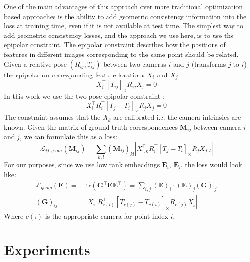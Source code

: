\documentclass[10pt,twocolumn,letterpaper]{article}
\newcommand{\mat}[1]{\mathbf{#1}}
\newcommand{\cross}[1]{[#1]_{\times}}
\begin{document}
One of the main advantages of this approach over more traditional optimization based approaches is the ability to add geometric consistency information into the loss at training time, even if it is not available at test time.
The simplest way to add geometric consistency losses, and the approach we use here, is to use the epipolar constraint.
The epipolar constraint describes how the positions of features in different images corresponding to the same point should be related.
Given a relative pose $(R_{ij}, T_{ij})$ between two cameras $i$ and $j$  (transforms $j$ to $i$) the epipolar on corresponding feature locations $X_i$ and $X_j$:
\begin{equation}
X_{i}^\top \cross{T_{ij}}R_{ij} X_{j} = 0
\label{eq:essential_constraint_rel}
\end{equation}
In this work we use the two pose epipolar constraint \cite{tron2014quotient}:
\begin{equation}
X_{i}^\top R_{i}^\top \cross{T_{j} - T_{i}}R_{j} X_{j} = 0
\label{eq:essential_constraint}
\end{equation}
The constraint assumes that the $X_k$ are calibrated i.e. the camera intrinsics are known. 
Given the matrix of ground truth correspondences $\mat{M}_{ij}$ between camera $i$ and $j$, we can formulate this as a loss:
\begin{equation}
\mathcal{L}_{ij,geom}(\mat{M}_{ij}) = \sum_{k,l} (\mat{M}_{ij})_{kl} \left|X_{i,k}^\top R_{i}^\top \cross{T_{j} - T_{i}}R_{j} X_{j,l}\right|
\label{eq:geom_cost}
\end{equation}
For our purposes, since we use low rank embeddings $\mat{E}_{i}$, $\mat{E}_{j}$, the loss would look like:
\begin{align}
\mathcal{L}_{geom}(\mat{E})
=&\; \mathrm{tr}(\mat{G}^\top \mat{E}\mat{E}^\top) = \sum_{i,j} (\mat{E})_{i} \cdot (\mat{E})_{j} (\mat{G})_{ij} \\
(\mat{G})_{ij} =&\; \left|X_{i}^\top R_{c(i)}^\top \cross{T_{c(j)} - T_{c(i)}}R_{c(j)} X_{j}\right| \nonumber
\label{eq:geom_cost2}
\end{align}
Where $c(i)$ is the appropriate camera for point index $i$.


\section{Experiments}
\end{document}
